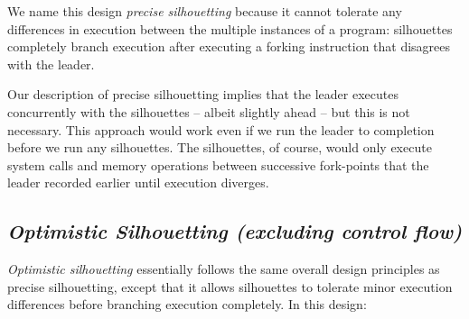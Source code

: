 \noindent We name this design {\em precise silhouetting} because
it cannot tolerate any differences in execution
between the multiple instances of a program:
silhouettes completely branch
execution after executing a
forking instruction that disagrees
with the leader. 

Our description of precise silhouetting implies
that the leader executes concurrently
with the silhouettes -- albeit slightly ahead --
but this is not necessary.
This approach would work even
if we run the leader to completion
before we run any silhouettes. 
The silhouettes, of course, would only execute system calls and memory
operations between successive fork-points that the leader recorded earlier
until execution diverges.

\subsection{\em Optimistic Silhouetting (excluding control flow)}\label{opt:sil}
{\em Optimistic silhouetting} essentially follows the 
same overall design principles
as precise silhouetting,
except that it allows silhouettes
to tolerate minor execution differences 
before branching execution completely.
In this design:

